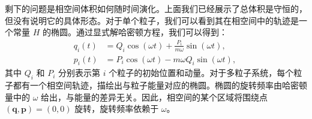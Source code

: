 剩下的问题是相空间体积如何随时间演化。上面我们已经展示了总体积是守恒的，但没有说明它的具体形态。对于单个粒子，我们可以看到其在相空间中的轨迹是一个常量 \( H \) 的椭圆。通过显式解哈密顿方程，我们可以得到：
\[
\begin{aligned}
q_i(t) &= Q_i \cos(\omega t) + \frac{P_i}{m\omega} \sin(\omega t), \\
p_i(t) &= P_i \cos(\omega t) - m\omega Q_i \sin(\omega t),
\end{aligned}~
\]
其中 \( Q_i \) 和 \( P_i \) 分别表示第 \(i\) 个粒子的初始位置和动量。对于多粒子系统，每个粒子都有一个相空间轨迹，描绘出与粒子能量对应的椭圆。椭圆的旋转频率由哈密顿量中的 \( \omega \) 给出，与能量的差异无关。因此，相空间的某个区域将围绕点 \( (\mathbf{q}, \mathbf{p}) = (0, 0) \) 旋转，旋转频率依赖于 \( \omega \)。